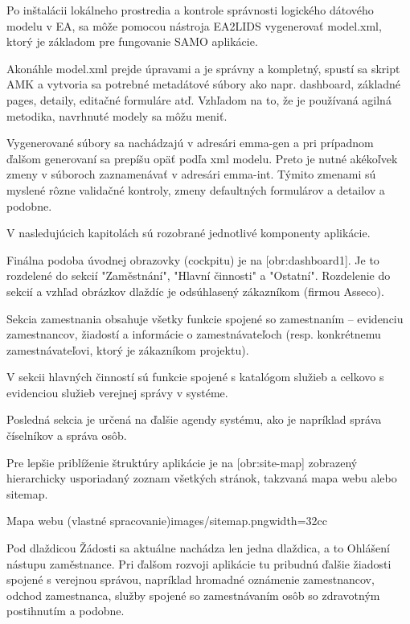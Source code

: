 Po inštalácii lokálneho prostredia a kontrole správnosti logického dátového modelu v EA, sa môže pomocou nástroja EA2LIDS vygenerovať model.xml, ktorý je základom pre fungovanie SAMO aplikácie. 

Akonáhle model.xml prejde úpravami a je správny a kompletný, spustí sa skript AMK a vytvoria sa potrebné metadátové súbory ako napr. dashboard, základné pages, detaily, editačné formuláre atď. Vzhľadom na to, že je používaná agilná metodika, navrhnuté modely sa môžu meniť.

Vygenerované súbory sa nachádzajú v adresári emma-gen a pri prípadnom ďalšom generovaní sa prepíšu opäť podľa xml modelu. Preto je nutné akékoľvek zmeny v súboroch zaznamenávať v adresári emma-int. Týmito zmenami sú myslené rôzne validačné kontroly, zmeny defaultných formulárov a detailov a podobne.

V nasledujúcich kapitolách sú rozobrané jednotlivé komponenty aplikácie.

Finálna podoba úvodnej obrazovky (cockpitu) je na [obr:dashboard1]. Je to rozdelené do sekcií "Zaměstnání", "Hlavní činnosti" a "Ostatní". Rozdelenie do sekcií a vzhľad obrázkov dlaždíc je odsúhlasený zákazníkom (firmou Asseco).

Sekcia zamestnania obsahuje všetky funkcie spojené so zamestnaním -- evidenciu zamestnancov, žiadostí a informácie o zamestnávateľoch (resp. konkrétnemu zamestnávateľovi, ktorý je zákazníkom projektu). 

V sekcii hlavných činností sú funkcie spojené s katalógom služieb a celkovo s evidenciou služieb verejnej správy v systéme. 

Posledná sekcia je určená na ďalšie agendy systému, ako je napríklad správa číselníkov a správa osôb.

Pre lepšie priblíženie štruktúry aplikácie je na [obr:site-map] zobrazený hierarchicky usporiadaný zoznam všetkých stránok, takzvaná mapa webu alebo sitemap.

{Mapa webu (vlastné spracovanie)}{images/sitemap.png}{width=32cc} 


Pod dlaždicou Žádosti sa aktuálne nachádza len jedna dlaždica, a to Ohlášení nástupu zaměstnance. Pri ďalšom rozvoji aplikácie tu pribudnú ďalšie žiadosti spojené s verejnou správou, napríklad hromadné oznámenie zamestnancov, odchod zamestnanca, služby spojené so zamestnávaním osôb so zdravotným postihnutím a podobne.

